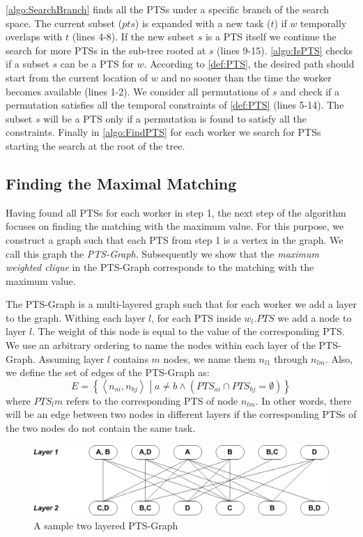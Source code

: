 \cref{algo:SearchBranch} finds all the PTSs under a specific branch of the search space. The current subset ($pts$) is expanded with a new task ($t$) if $w$ temporally overlaps with $t$ (lines 4-8). If the new subset $s$ is a PTS itself we continue the search for more PTSs in the sub-tree rooted at $s$ (lines  9-15). \cref{algo:IsPTS} checks if a subset $s$ can be a PTS for $w$. According to \cref{def:PTS}, the desired path should start from the current location of $w$ and no sooner than the time the worker becomes available (lines  1-2). We consider all permutations of $s$ and check if a permutation satisfies all the temporal constraints of \cref{def:PTS} (lines 5-14). The subset $s$ will be a PTS only if a permutation is found to satisfy all the constraints. Finally in \cref{algo:FindPTS} for each worker we search for PTSs starting the search at the root of the tree.
			
\subsection{Finding the Maximal Matching}
\label{subsec:FindMM}
Having found all PTSs for each worker in step 1, the next step of the algorithm focuses on finding the matching with the maximum value. For this purpose, we construct a graph such that each PTS from step 1 is a vertex in the graph. We call this graph the \emph{PTS-Graph}. Subsequently we show that the \emph{maximum weighted clique} in the PTS-Graph corresponds to the matching with the maximum value.

The PTS-Graph is a multi-layered graph such that for each worker we add a layer to the graph. Withing each layer $l$, for each PTS inside $w_l.PTS$ we add a node to layer $l$. The weight of this node is equal to the value of the corresponding PTS. We use an arbitrary ordering to name the nodes within each layer of the PTS-Graph. Assuming layer $l$ contains $m$ nodes, we name them $n_{l1}$ through $n_{lm}$. Also, we define the set of edges of the PTS-Graph as:
\begin{equation*}
E = \left\{ \left\langle n_{ai}, n_{bj} \right\rangle \middle | a \neq b \land \left(PTS_{ai} \cap PTS_{bj} = \emptyset \right) \right\}
\end{equation*}
where $PTS_lm$ refers to the corresponding PTS of node $n_{lm}$. In other words, there will be an edge between two nodes in different layers if the corresponding PTSs of the two nodes do not contain the same task.

\begin{figure}[t]
	\centering
	\includegraphics[width = 0.85\columnwidth]{figures/PTS_graph.png}
			\vspace{-0.2cm}
	\caption{A sample two layered PTS-Graph}
	\label{fig:PTS_tree}
			\vspace{-0.2cm}
\end{figure}

